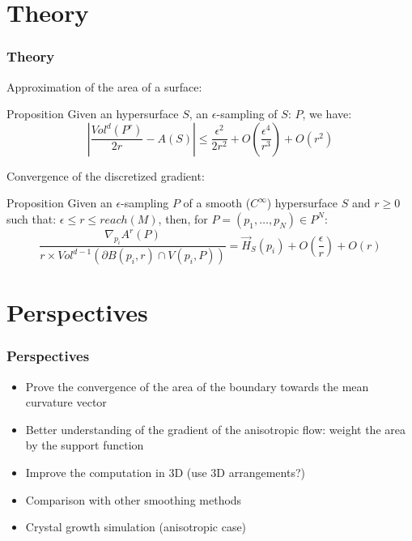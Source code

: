 \documentclass{beamer}
\newcommand{\meanv}[1]{\vec{H}_{#1}}
\begin{document}
\section{Theory}

\begin{frame}
    \frametitle{Theory}

    Approximation of the area of a surface:
    \begin{block}{Proposition}
        Given an hypersurface $ S $, an $\epsilon$-sampling of $ S $: $ P $, we
        have:
        $$
            \left| \frac{Vol^d(P^r)}{2r} - A(S) \right| \leq \frac{\epsilon^2}{2r^2} +
            O \left(\frac{\epsilon^4}{r^3} \right) + O(r^2)
        $$
    \end{block}

    Convergence of the discretized gradient:
    \begin{block}{Proposition}
        Given an $\epsilon$-sampling $ P $ of a smooth ($ C^{\infty} $) hypersurface
        $ S $ and $ r \ge 0 $ such that: $ \epsilon \leq r \leq reach(M) $, then,
        for $ P = (p_1, \ldots, p_N) \in P^N $:
        $$
            \frac{\nabla_{p_i} A^r(P)}{r \times Vol^{d-1}(\partial B(p_i, r) \cap V(p_i, P))}
            = \meanv{S}(p_i) + O \left(\frac{\epsilon}{r}\right) + O(r)
        $$
    \end{block}
\end{frame}

\section{Perspectives}

\begin{frame}
    \frametitle{Perspectives}

    \begin{itemize}
        \item Prove the convergence of the area of the boundary towards the mean
            curvature vector
        \item Better understanding of the gradient of the anisotropic flow:
            weight the area by the support function
        \item Improve the computation in 3D (use 3D arrangements?)
        \item Comparison with other smoothing methods
        \item Crystal growth simulation (anisotropic case)
    \end{itemize}
\end{frame}
\end{document}
